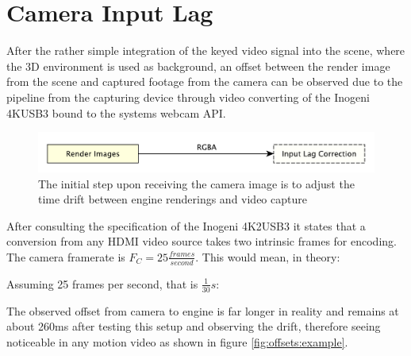 %
\section{Camera Input Lag}

After the rather simple integration of the keyed video signal into the scene, 
where the 3D environment is used as background, an offset between the render 
image from the scene and captured footage from the camera can be observed due 
to the pipeline from the capturing device through video converting of the 
Inogeni 4KUSB3 bound to the systems webcam API.

\begin{figure}[htb]
	\includegraphics[width=\textwidth]{_raw_resources/pipeline_steps/4_2_swapper.pdf}
	\caption{The initial step upon receiving the camera image is to adjust the 
	time drift between engine renderings and video capture}
	\label{fig:steps:swapper}
\end{figure}

After consulting the specification of the Inogeni 4K2USB3 it states that a 
conversion from any HDMI video source takes two intrinsic frames for encoding. 
The camera framerate is $F_C = 25 \frac{frames}{second}$. This would mean, in 
theory:


Assuming 25 frames per second, that is $\frac{1}{30}s$:



The observed offset from camera to engine is far longer in reality and remains 
at about 260ms after testing this setup and observing the drift, therefore 
seeing noticeable in any motion video as shown in figure 
\ref{fig:offsets:example}.

